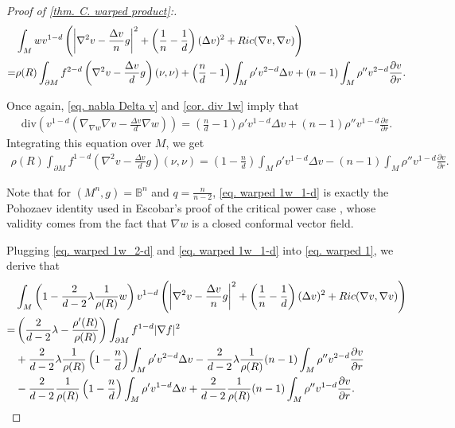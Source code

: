 \documentclass[12pt]{amsart}%
\numberwithin{equation}{section}
\numberwithin{lemma}{section}
\numberwithin{proposition}{section}
\numberwithin{corollary}{section}
\numberwithin{remark}{section}
\begin{document}
\begin{proof}[Proof of \cref{thm. C. warped product}:]
    \begin{align}\label{eq. warped 1w_2-d}
        &\int_{M}wv^{1-d}\left(
        \left|\nabla^2 v-\frac{\Delta v}{n}g\right|^2
        +\left(\frac{1}{n}-\frac{1}{d}\right)(\Delta v)^2
        +Ric(\nabla v,\nabla v)
        \right)\notag\\
        =&\rho(R)\int_{\partial M}f^{2-d}\left(\nabla^2 v-\frac{\Delta v}{d}g\right)(\nu,\nu)
        +\left(\frac{n}{d}-1\right)
        \int_{M}\rho'v^{2-d}\Delta v
        +(n-1)\int_M\rho''v^{2-d}\frac{\partial v}{\partial r}.
    \end{align}
    

    Once again, \cref{eq. nabla Delta v} and \cref{cor. div 1w} imply that
    \begin{align*}
        \mathrm{div}\left(
        v^{1-d}
        \left(\nabla_{\nabla w}\nabla v-\frac{\Delta v}{d}\nabla w\right)
        \right)
        =\left(\frac{n}{d}-1\right)
        \rho'v^{1-d}\Delta v
        +(n-1)\rho''v^{1-d}\frac{\partial v}{\partial r}.
    \end{align*}
    Integrating this equation over $M$, we get
    \begin{align}\label{eq. warped 1w_1-d}
        \rho(R)\int_{\partial M}f^{1-d}
        \left(\nabla^2 v-\frac{\Delta v}{d}g\right)(\nu,\nu)
        =\left(1-\frac{n}{d}\right)
        \int_{M}\rho'v^{1-d}\Delta v
        -(n-1)\int_M \rho''v^{1-d}\frac{\partial v}{\partial r}.
    \end{align}

    Note that for $(M^n,g)=\mathbb{B}^n$ and $q=\frac{n}{n-2}$, \cref{eq. warped 1w_1-d} is exactly the Pohozaev identity \cite[Proposition 1.4]{Sch88} used in Escobar's proof of the critical power case \cite[Theorem 2.1]{Esc90}, whose validity comes from the fact that $\nabla w$ is a closed conformal vector field.
    

    Plugging \cref{eq. warped 1w_2-d} and \cref{eq. warped 1w_1-d} into \cref{eq. warped 1}, we derive that
    \begin{align}\label{eq. subkey integral identity}
        &\int_M \left(1-\frac{2}{d-2}\lambda\frac{1}{\rho(R)}w\right)
        v^{1-d}\left(
        \left|\nabla^2v-\frac{\Delta v}{n}g\right|^2
        +\left(\frac{1}{n}-\frac{1}{d}\right)(\Delta v)^2
        +Ric(\nabla v,\nabla v)
        \right)\notag\\
        =&\left(\frac{2}{d-2}\lambda-\frac{\rho'(R)}{\rho(R)}\right)\int_{\partial M}f^{1-d}|\nabla f|^2\notag\\
        &
        +\frac{2}{d-2}\lambda\frac{1}{\rho(R)}
        \left(1-\frac{n}{d}\right)\int_M \rho' v^{2-d}\Delta v
        -\frac{2}{d-2}\lambda\frac{1}{\rho(R)}(n-1)\int_M \rho''v^{2-d}\frac{\partial v}{\partial r}\notag\\
        &-\frac{2}{d-2}\frac{1}{\rho(R)}
        \left(1-\frac{n}{d}\right)\int_M \rho' v^{1-d}\Delta v
        +\frac{2}{d-2}\frac{1}{\rho(R)}(n-1)\int_M \rho'' v^{1-d}\frac{\partial v}{\partial r}.
    \end{align}


\end{proof}
\end{document}
